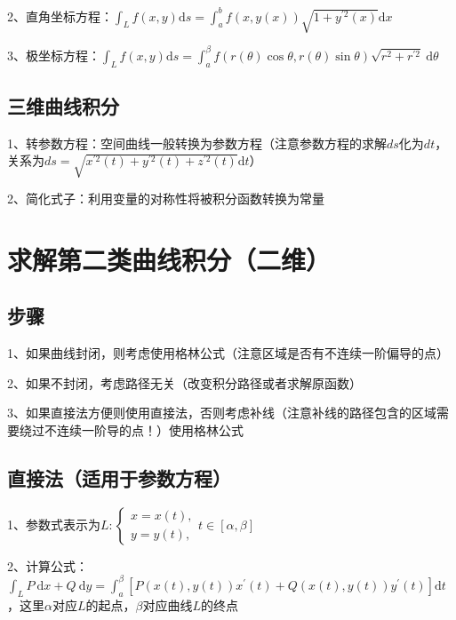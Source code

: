 2、直角坐标方程：$\int_{L} f(x, y) \mathrm{d} s=\int_{a}^{b} f(x, y(x)) \sqrt{1+y^{\prime 2}(x)} \mathrm{d} x$

3、极坐标方程：$\int_{L} f(x, y) \mathrm{d} s=\int_{a}^{\beta} f(r(\theta) \cos \theta, r(\theta) \sin \theta) \sqrt{r^{2}+r^{\prime 2}} \mathrm{~d} \theta$



\subsection{三维曲线积分}

1、转参数方程：空间曲线一般转换为参数方程（注意参数方程的求解$ds$化为$dt$，关系为$ds = \sqrt{x^{\prime 2}(t)+y^{\prime 2}(t)+z^{\prime 2}(t)} \mathrm{d} t$）

2、简化式子：利用变量的对称性将被积分函数转换为常量

\section{求解第二类曲线积分（二维）}



\subsection{步骤}

1、如果曲线封闭，则考虑使用格林公式（注意区域是否有不连续一阶偏导的点）

2、如果不封闭，考虑路径无关（改变积分路径或者求解原函数）

3、如果直接法方便则使用直接法，否则考虑补线（注意补线的路径包含的区域需要绕过不连续一阶导的点！）使用格林公式



\subsection{直接法（适用于参数方程）}

1、参数式表示为$L:\left\{\begin{array}{l}x=x(t), \\ y=y(t),\end{array} t \in[\alpha, \beta]\right.$

2、计算公式：$\int_{L} P \mathrm{~d} x+Q \mathrm{~d} y=\int_{a}^{\beta}\left[P(x(t), y(t)) x^{\prime}(t)+Q(x(t), y(t)) y^{\prime}(t)\right] \mathrm{d} t$，这里$\alpha$对应$L$的起点，$\beta$对应曲线$L$的终点



